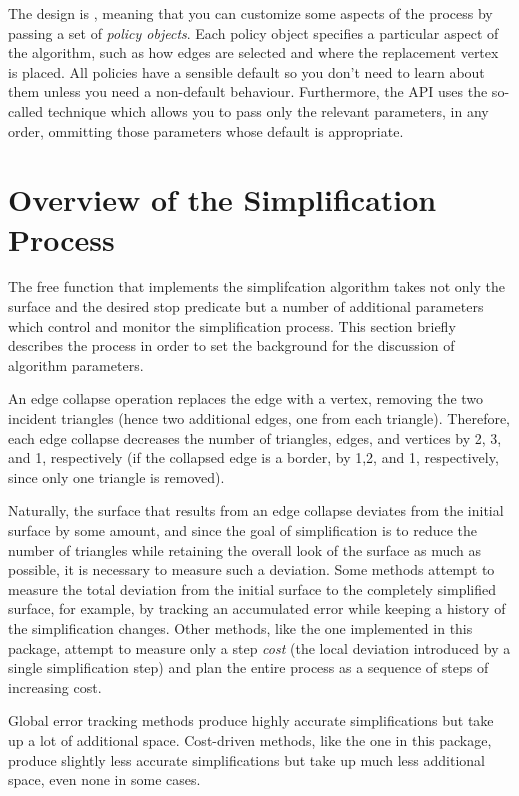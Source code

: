 The design is ,
meaning that you can customize some aspects of the process by passing a set of {\em policy objects}. Each policy object specifies a particular aspect of the algorithm, such as how edges are selected and where the replacement vertex is placed. All policies have a sensible default so you don't need to learn about them unless you need a non-default behaviour. Furthermore, the API uses the so-called  technique which allows you to pass only the relevant parameters, in any order, ommitting
those parameters whose default is appropriate.

\section{Overview of the Simplification Process}

The free function that implements the simplifcation algorithm takes not only the surface and the desired stop predicate but a number of additional parameters which control and monitor the simplification process. This section briefly describes the process in order to set the background for the discussion of algorithm parameters.

An edge collapse operation replaces the edge with a vertex, removing the two incident triangles (hence two additional edges, one from each triangle). Therefore, each edge collapse decreases the number of triangles, edges, and vertices by 2, 3, and 1, respectively (if the collapsed edge is a border, by 1,2, and 1, respectively, since only one triangle is removed).

Naturally, the surface that results from an edge collapse deviates from the initial surface by some amount, and since the goal of simplification is to reduce the number of triangles while retaining the overall look of the surface as much as possible, it is necessary to measure such a deviation. Some methods attempt to measure the total deviation from the initial surface to the completely simplified surface, for example, by tracking an accumulated error while keeping a history of the simplification changes. Other methods, like the one implemented in this package, attempt to measure only a step {\em cost} (the local deviation introduced by a single simplification step) and plan the entire process as a sequence of steps of increasing cost. 

Global error tracking methods produce highly accurate simplifications but take up a lot of additional space. Cost-driven methods, like the one in this package, produce slightly less accurate simplifications but take up much less additional space, even none in some cases.


